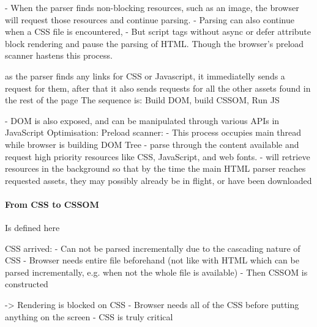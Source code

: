 
- When the parser finds non-blocking resources, such as an image, the browser will request those resources and continue parsing.
- Parsing can also continue when a CSS file is encountered,
- But script tags without async or defer attribute block rendering and pause the parsing of HTML.
Though the browser's preload scanner hastens this process.



as the parser finds any links for CSS or Javascript, it immediatelly sends a request for them, after that it also sends requests for all the other assets found in the rest of the page
The sequence is: Build DOM, build CSSOM, Run JS




- DOM is also exposed, and can be manipulated through various APIs in JavaScript
Optimisation: Preload scanner:
- This process occupies main thread while browser is building DOM Tree
- parse through the content available and request high priority resources like CSS, JavaScript, and web fonts.
- will retrieve resources in the background so that by the time the main HTML parser reaches requested assets, they may possibly already be in flight, or have been downloaded





\paragraph{From CSS to CSSOM}

Is defined here %


CSS arrived:
- Can not be parsed incrementally due to the cascading nature of CSS
- Browser needs entire file beforehand (not like with HTML which can be parsed incrementally, e.g. when not the whole file is available)
- Then CSSOM is constructed

-> Rendering is blocked on CSS
- Browser needs all of the CSS before putting anything on the screen
- CSS is truly critical


